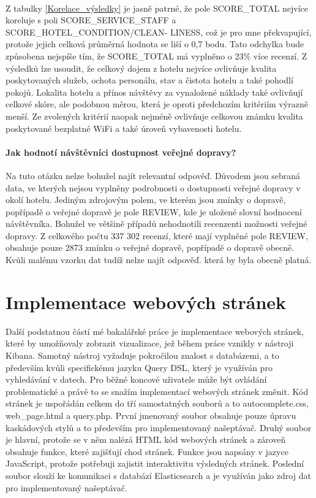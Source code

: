 \documentclass[czech,BP]{thesiskiv}
\begin{document}
 \\ \noindent
Z tabulky \ref{Korelace_výsledky} je jasně patrné, že pole SCORE\_TOTAL nejvíce koreluje s poli SCORE\_SERVICE\_STAFF a SCORE\_HOTEL\_CONDITION/CLEAN- LINESS, což je pro mne překvapující, protože jejich celková průměrná hodnota se liší o 0,7 bodu. Tato odchylka bude způsobena nejspíše tím, že SCORE\_TOTAL má vyplněno o 23\% více recenzí. Z výsledků lze usoudit, že celkový dojem z hotelu nejvíce ovlivňuje kvalita poskytovaných služeb, ochota personálu, stav a čistota hotelu a také pohodlí pokojů. Lokalita hotelu a přínos návštěvy za vynaložené náklady také ovlivňují celkové skóre, ale podobnou měrou, která je oproti předchozím kritériím výrazně menší. Ze zvolených kritérií naopak nejméně ovlivňuje celkovou známku kvalita poskytované bezplatné WiFi a také úroveň vybavenosti hotelu. 
\subsubsection{Jak hodnotí návštěvníci dostupnost veřejné dopravy?}
\label{doprava}
Na tuto otázku nelze  bohužel najít relevantní odpověď. Důvodem jsou sebraná data, ve kterých nejsou vyplněny podrobnosti o dostupnosti veřejné dopravy v okolí hotelu. Jediným zdrojovým polem, ve kterém jsou zmínky o dopravě, popřípadě o veřejné dopravě je pole REVIEW, kde je uložené slovní hodnocení návštěvníka. Bohužel ve většině případů nehodnotili recenzenti možnosti veřejné dopravy. Z celkového počtu 337 302 recenzí, které mají vyplněné pole REVIEW, obsahuje pouze 2873 zmínku o veřejné dopravě, popřípadě o dopravě obecně. Kvůli malému vzorku dat tudíž nelze najít odpověď. která by byla obecně platná.

\chapter{Implementace webových stránek}
\label{chap:WEB}
Další podstatnou částí mé bakalářské práce je implementace webových stránek, které by umožňovaly zobrazit vizualizace, jež během práce vznikly v nástroji Kibana. Samotný nástroj vyžaduje pokročilou znalost s databázemi, a to především kvůli specifickému jazyku Query DSL, který je využíván pro vyhledávání v datech. Pro běžné koncové uživatele může být ovládání problematické a právě to se snažím implementací webových stránek změnit. Kód stránek je uspořádán celkem do tří samostatných souborů a to autocomplete.css, web\_page.html a query.php. První jmenovaný soubor obsahuje pouze úpravu kaskádových stylů a to především pro implementovaný našeptávač. Druhý soubor je hlavní, protože se v něm nalézá HTML kód webových stránek a zároveň obsahuje funkce, které zajišťují chod stránek. Funkce jsou napsány v jazyce JavaScript, protože potřebuji zajistit interaktivitu výsledných stránek. Poslední soubor slouží ke komunikaci s databází Elasticsearch a je využíván jako zdroj dat pro implementovaný našeptávač.
\end{document}
